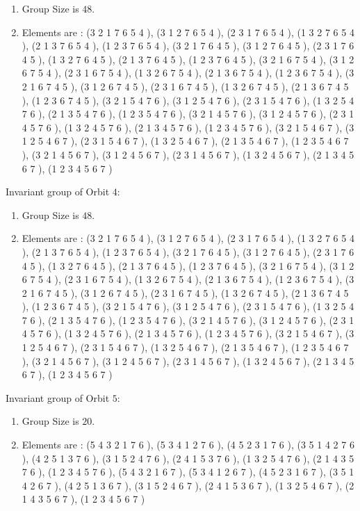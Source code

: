 \documentclass[12pt]{article}
\begin{document}
\begin{enumerate}
\item Group Size is $48$.
\item Elements are : (3 2 1 7 6 5 4  ), (3 1 2 7 6 5 4  ), (2 3 1 7 6 5 4  ), (1 3 2 7 6 5 4  ), (2 1 3 7 6 5 4  ), (1 2 3 7 6 5 4  ), (3 2 1 7 6 4 5  ), (3 1 2 7 6 4 5  ), (2 3 1 7 6 4 5  ), (1 3 2 7 6 4 5  ), (2 1 3 7 6 4 5  ), (1 2 3 7 6 4 5  ), (3 2 1 6 7 5 4  ), (3 1 2 6 7 5 4  ), (2 3 1 6 7 5 4  ), (1 3 2 6 7 5 4  ), (2 1 3 6 7 5 4  ), (1 2 3 6 7 5 4  ), (3 2 1 6 7 4 5  ), (3 1 2 6 7 4 5  ), (2 3 1 6 7 4 5  ), (1 3 2 6 7 4 5  ), (2 1 3 6 7 4 5  ), (1 2 3 6 7 4 5  ), (3 2 1 5 4 7 6  ), (3 1 2 5 4 7 6  ), (2 3 1 5 4 7 6  ), (1 3 2 5 4 7 6  ), (2 1 3 5 4 7 6  ), (1 2 3 5 4 7 6  ), (3 2 1 4 5 7 6  ), (3 1 2 4 5 7 6  ), (2 3 1 4 5 7 6  ), (1 3 2 4 5 7 6  ), (2 1 3 4 5 7 6  ), (1 2 3 4 5 7 6  ), (3 2 1 5 4 6 7  ), (3 1 2 5 4 6 7  ), (2 3 1 5 4 6 7  ), (1 3 2 5 4 6 7  ), (2 1 3 5 4 6 7  ), (1 2 3 5 4 6 7  ), (3 2 1 4 5 6 7  ), (3 1 2 4 5 6 7  ), (2 3 1 4 5 6 7  ), (1 3 2 4 5 6 7  ), (2 1 3 4 5 6 7  ), (1 2 3 4 5 6 7  )
\end{enumerate}
Invariant group of Orbit $4$:
\begin{enumerate}
\item Group Size is $48$.
\item Elements are : (3 2 1 7 6 5 4  ), (3 1 2 7 6 5 4  ), (2 3 1 7 6 5 4  ), (1 3 2 7 6 5 4  ), (2 1 3 7 6 5 4  ), (1 2 3 7 6 5 4  ), (3 2 1 7 6 4 5  ), (3 1 2 7 6 4 5  ), (2 3 1 7 6 4 5  ), (1 3 2 7 6 4 5  ), (2 1 3 7 6 4 5  ), (1 2 3 7 6 4 5  ), (3 2 1 6 7 5 4  ), (3 1 2 6 7 5 4  ), (2 3 1 6 7 5 4  ), (1 3 2 6 7 5 4  ), (2 1 3 6 7 5 4  ), (1 2 3 6 7 5 4  ), (3 2 1 6 7 4 5  ), (3 1 2 6 7 4 5  ), (2 3 1 6 7 4 5  ), (1 3 2 6 7 4 5  ), (2 1 3 6 7 4 5  ), (1 2 3 6 7 4 5  ), (3 2 1 5 4 7 6  ), (3 1 2 5 4 7 6  ), (2 3 1 5 4 7 6  ), (1 3 2 5 4 7 6  ), (2 1 3 5 4 7 6  ), (1 2 3 5 4 7 6  ), (3 2 1 4 5 7 6  ), (3 1 2 4 5 7 6  ), (2 3 1 4 5 7 6  ), (1 3 2 4 5 7 6  ), (2 1 3 4 5 7 6  ), (1 2 3 4 5 7 6  ), (3 2 1 5 4 6 7  ), (3 1 2 5 4 6 7  ), (2 3 1 5 4 6 7  ), (1 3 2 5 4 6 7  ), (2 1 3 5 4 6 7  ), (1 2 3 5 4 6 7  ), (3 2 1 4 5 6 7  ), (3 1 2 4 5 6 7  ), (2 3 1 4 5 6 7  ), (1 3 2 4 5 6 7  ), (2 1 3 4 5 6 7  ), (1 2 3 4 5 6 7  )
\end{enumerate}
Invariant group of Orbit $5$:
\begin{enumerate}
\item Group Size is $20$.
\item Elements are : (5 4 3 2 1 7 6  ), (5 3 4 1 2 7 6  ), (4 5 2 3 1 7 6  ), (3 5 1 4 2 7 6  ), (4 2 5 1 3 7 6  ), (3 1 5 2 4 7 6  ), (2 4 1 5 3 7 6  ), (1 3 2 5 4 7 6  ), (2 1 4 3 5 7 6  ), (1 2 3 4 5 7 6  ), (5 4 3 2 1 6 7  ), (5 3 4 1 2 6 7  ), (4 5 2 3 1 6 7  ), (3 5 1 4 2 6 7  ), (4 2 5 1 3 6 7  ), (3 1 5 2 4 6 7  ), (2 4 1 5 3 6 7  ), (1 3 2 5 4 6 7  ), (2 1 4 3 5 6 7  ), (1 2 3 4 5 6 7  )
\end{enumerate}
\end{document}
